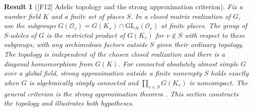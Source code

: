 \documentclass[11pt,a4paper,openany,oneside]{book}
\theoremstyle{resultstyle}
\newtheorem{statement}{Result}[chapter]
\newenvironment{result}[2]{\clubpenalty=10000\begin{statement}[\textnormal{[#1]} #2]\leavevmode\label{res:#1}\ignorespaces}{\end{statement}}
\theoremstyle{definition}
\numberwithin{equation}{chapter}
\newcommand{\GL}{\mathrm{GL}}
\newcommand{\OO}{\mathcal{O}}
\begin{document}
\begin{result}{F12}{Adelic topology and the strong approximation criterion}
Fix a number field $K$ and a finite set of places $S$. In a closed matrix realization of $G$, use the subgroups $G(\OO_v)=G(K_v)\cap\GL_N(\OO_v)$ at finite places. The group of $S$-adeles of $G$ is the restricted product of $G(K_v)$ for $v\notin S$ with respect to these subgroups, with any archimedean factors outside $S$ given their ordinary topology. The topology is independent of the chosen closed realization and there is a diagonal homomorphism from $G(K)$. For connected absolutely almost simple $G$ over a global field, strong approximation outside a finite nonempty $S$ holds exactly when $G$ is algebraically simply connected and $\prod_{v\in S}G(K_v)$ is noncompact. The general criterion is the strong approximation theorem \cite[Theorem 2.3]{rapinchuk}. This section constructs the topology and illustrates both hypotheses.
\end{result}
\end{document}
